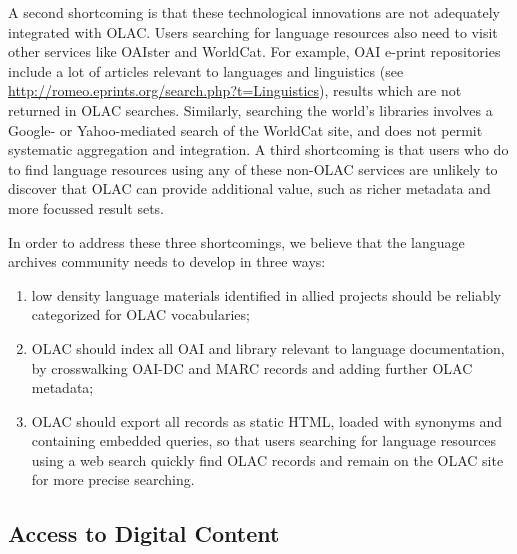 A second shortcoming is that these technological innovations are
not adequately integrated with OLAC.  Users searching for language
resources also need to visit other services like OAIster and WorldCat.
For example, OAI e-print repositories include a lot of articles
relevant to languages and linguistics (see
\url{http://romeo.eprints.org/search.php?t=Linguistics}),
results which are not returned in OLAC searches.
Similarly, searching the world's libraries involves a Google-
or Yahoo-mediated search of the WorldCat site, and does not
permit systematic aggregation and integration.
A third shortcoming is that users who do to find language resources
using any of these non-OLAC services are unlikely to discover that
OLAC can provide additional value, such as richer metadata and more
focussed result sets.


In order to address these three shortcomings, we believe that the
language archives community needs to develop in three ways:

\begin{enumerate}\setlength{\itemsep}{0pt}
\item low density language materials identified in allied projects
      should be reliably categorized for OLAC vocabularies;
\item OLAC should index all OAI and library relevant to language
      documentation, by crosswalking OAI-DC and MARC records and
      adding further OLAC metadata;
\item OLAC should export all records as static HTML, loaded with
      synonyms and containing embedded queries, so that
      users searching for language resources using a web search
      quickly find OLAC records and remain on the OLAC site for
      more precise searching.
\end{enumerate}



\vspace{1in}

\subsection{Access to Digital Content}

\vspace{1in}

